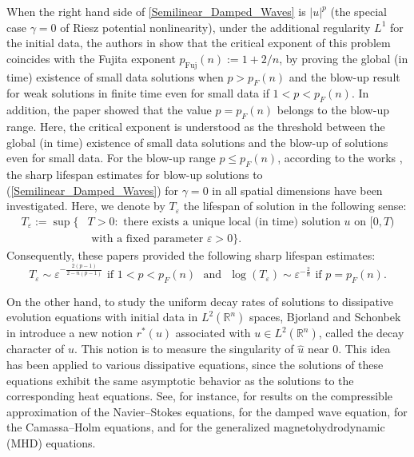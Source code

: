 \documentclass[11pt,reqno]{amsart}
\begin{document}
When the right hand side of \eqref{Semilinear_Damped_Waves} is $|u|^{p}$ (the special case $\gamma=0$ of Riesz potential nonlinearity), under the additional regularity $L^1$ for the initial data, the authors in \cite{Todorova2001, IkehataTanizawa2005,Ikehata2002} show that the critical exponent of this problem coincides with the Fujita exponent $p_{\mathrm{Fuj}}(n):=1+2/n$, by proving the global (in time) existence of small data solutions when $p > p_{F}(n)$ and the blow-up result for weak solutions in finite time even for small data if $1 < p < p_{F}(n)$. In addition, the paper \cite{Zhang-2001} showed that the value $p= p_F(n)$ belongs to the blow-up range.  Here, the critical exponent is understood as the threshold
between the global (in time) existence of small data solutions and the blow-up of solutions
even for small data. For the blow-up range $p \leq p_F(n)$, according to the works \cite{LiZhou1995, Ikeda2016, Lai2019}, the sharp lifespan estimates for blow-up solutions to (\ref{Semilinear_Damped_Waves}) for $\gamma = 0$ in all spatial dimensions have been investigated. Here, we denote by $T_{\varepsilon}$ the lifespan of solution in the following sense:
$$
\begin{aligned}
T_{\varepsilon}:=\sup\{& T > 0:\text{ there exists a unique local (in time) solution $u$ on $[0,T)$}\\
&\text{ with a fixed parameter $\varepsilon>0$}\}.
\end{aligned}
$$ 
Consequently, these papers provided the following sharp lifespan estimates:
$$
T_{\varepsilon} \sim \varepsilon^{-\frac{2(p-1)}{2-n(p-1)}} \text{ if } 1<p<p_F(n) \,\,\text{ and }\,\, \log(T_{\varepsilon}) \sim  \varepsilon^{-\frac{2}{n}} \text{ if } p = p_F(n).
$$

On the other hand, to study the uniform decay rates of solutions to dissipative evolution equations with initial data in $L^2(\mathbb{R}^n)$ spaces, Bjorland and Schonbek in \cite{Bjorland2009} introduce a new notion $r^*(u)$ associated with $u\in L^2(\mathbb{R}^n)$, called the decay character of $u$. This notion is to measure the singularity of $\widehat{u}$ near $0$. This idea has been applied to various dissipative equations, since the solutions of these equations exhibit the same asymptotic behavior as the solutions to the corresponding heat equations. See, for instance, \cite{Niche2015} for results on the compressible approximation of the Navier–Stokes equations, \cite{Armando2022} for the damped wave equation, \cite{AnhTrang2018} for the Camassa–Holm equations, and \cite{AnhDuongToi2026} for the generalized magnetohydrodynamic (MHD) equations.  
\end{document}
